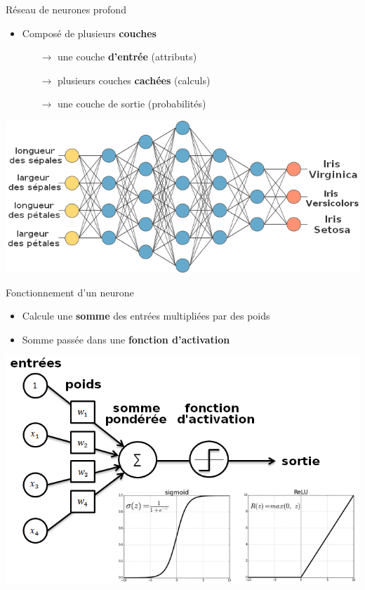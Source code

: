 \documentclass[compress]{beamer}
\begin{document}
\begin{frame}{Réseau de neurones profond}
  \begin{itemize}
  	\item 	Composé de plusieurs \textbf{\color{fibeamer@orange}couches}
  	\begin{itemize}
  		\item[$\rightarrow$] une couche \textbf{\color{fibeamer@orange}d'entrée} (attributs)
  		\item[$\rightarrow$] plusieurs couches \textbf{\color{fibeamer@orange} cachées} (calculs)
  		\item[$\rightarrow$] une couche de {\color{fibeamer@orange}sortie} (probabilités)
  	\end{itemize}
  \end{itemize}	
	\centering
	\includegraphics[width=1\linewidth]{resources/clem/simple_network2}
\end{frame}

\begin{frame}{Fonctionnement d'un neurone}
	\begin{itemize}
		\item Calcule une \textbf{\color{fibeamer@orange}somme} des entrées multipliées par des poids 
		\item Somme passée dans une \textbf{\color{fibeamer@orange}fonction d'activation}
	\end{itemize}	
	\centering
	\includegraphics[width=0.9\linewidth]{resources/clem/perceptron2}
\end{frame}
\end{document}
